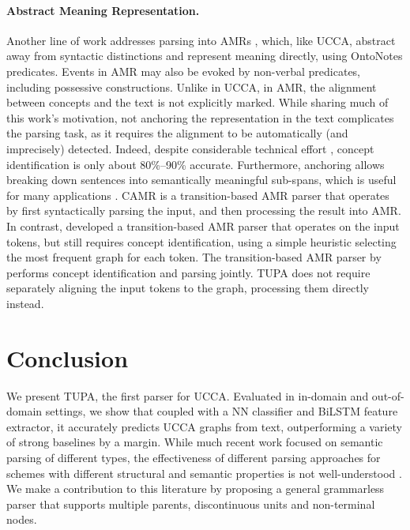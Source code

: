 \documentclass[11pt,a4paper]{article}
\newcommand{\parser}[1]{TUPA\textsubscript{#1}}
\begin{document}
\paragraph{Abstract Meaning Representation.}
Another line of work addresses parsing into AMRs
\cite{flanigan2014discriminative,vanderwende2015amr,pust2015parsing,artzi2015broad},
which, like UCCA, abstract away from syntactic distinctions
and represent meaning directly, using OntoNotes predicates.
Events in AMR may also be evoked by non-verbal predicates, including possessive constructions.
Unlike in UCCA, in AMR, the alignment between concepts and the text is not explicitly marked.
While sharing much of this work's motivation, not anchoring the representation in the text
complicates the parsing task, as it requires
the alignment to be automatically (and imprecisely) detected.
Indeed, despite considerable technical effort
\cite{flanigan2014discriminative,pourdamghani2014aligning,werling2015robust},
concept identification is only about 80\%--90\% accurate.
Furthermore, anchoring allows breaking down sentences into semantically meaningful sub-spans,
which is useful for many applications \cite{fernandez2015parsing,birch2016hume}.
CAMR \cite{wang-xue-pradhan:2015:ACL-IJCNLP,wang2015transition,wang-EtAl:2016:SemEval,goodman2016noise}
is a transition-based AMR parser that operates by first syntactically parsing the input,
and then processing the result into AMR.
In contrast,
\citet{damonte2016incremental} developed a transition-based AMR parser that
operates on the input tokens, but still requires concept identification, using
a simple heuristic selecting the most frequent graph for each token.
The transition-based AMR parser by \citet{zhou2016amr} performs concept identification
and parsing jointly.
\parser{} does not require separately aligning the input tokens to the graph,
processing them directly instead.



\section{Conclusion}\label{sec:conclusion}

We present \parser{}, the first parser for UCCA.
Evaluated in in-domain and out-of-domain settings, we show that coupled with a
NN classifier and BiLSTM feature extractor,
it accurately predicts UCCA graphs from text, outperforming a variety of
strong baselines by a margin.
While much recent work focused on semantic parsing of different types,
the effectiveness of different parsing approaches for schemes with
different structural and semantic properties is not well-understood
\cite{kuhlmann2016towards}.
We make a contribution to this literature by proposing a general grammarless parser
that supports multiple parents, discontinuous units and non-terminal nodes.
\end{document}
